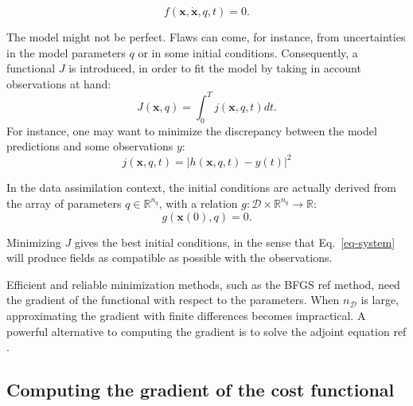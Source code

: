 \documentclass[aip,pof,nofootinbib,reprint,onecolumn]{revtex4-1}
\newcommand{\todo}[1]{{\color{red} #1 }}
\newcommand{\gras}[1]{\boldsymbol{#1}}
\newcommand{\Ephaz}{\mathcal{D}}%
\newcommand{\Nphaz}{n_{\mathcal{D}}} %
\newcommand{\fdyn}{f} %
\newcommand{\costf}{J} %
\newcommand{\costff}{j} %
\newcommand{\obs}{y} %
\newcommand{\point}{\gras{x}} %
\begin{document}
\begin{equation}
\fdyn(\point,\dot{\point},q,t) =0.
\label{eq-system}
\end{equation} 

The model might not be perfect. Flaws can come, for instance, from
uncertainties in the model parameters $q$ or in some initial conditions.
Consequently, a functional $\costf$ is introduced, in order to fit the model
by taking in account observations at hand:
\begin{equation}
\costf(\point,q) = \int_0^T  \costff(\point,q,t) dt.
\label{eq-def_cost}
\end{equation} 
For instance, one may want to minimize the discrepancy between the model predictions and some observations $\obs$:
$$\costff(\point,q,t) = \left|h(\point,q,t) - \obs(t)\right|^2$$ 

In the data assimilation context, the initial conditions are actually derived from the array of parameters $q\in\mathbb{R}^{n_q}$, with a relation $g:\Ephaz\times\mathbb{R}^{n_q}\rightarrow\mathbb{R}$:
$$g(\point(0),q) = 0.$$

Minimizing $\costf$ gives the best initial conditions, in the sense that Eq.~\eqref{eq-system} will produce fields as compatible as possible with the observations.

Efficient and reliable minimization methods, such as the BFGS\todo{ref}
method, need the gradient of the functional with respect to the parameters.
When $\Nphaz$ is large, approximating the gradient with finite differences
becomes impractical. A powerful alternative to computing the gradient is to
solve the adjoint equation\todo{ref}.
\subsection{Computing the gradient of the cost functional}
\end{document}

